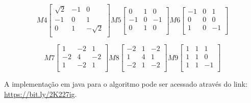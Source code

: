 \documentclass[
	12pt,				%
	oneside,			%
	a4paper,			%
	english,			%
	french,				%
	spanish,			%
	brazil,				%
	]{abntex2}
\begin{document}
\[
M4
\begin{bmatrix}
      \sqrt{2} &            -1 &  0         \\
	        -1 &             0 & 1          \\
	         0 &             1 & -\sqrt{2}  \\
\end{bmatrix} 
M5
\begin{bmatrix}
    	 	 0 &             1 &  0          \\ 
	        -1 &             0 & -1          \\ 
	         0 &             1 &  0          \\ 
\end{bmatrix}
M6
\begin{bmatrix}
  	 	 	-1 &             0 &  1          \\ 
             0 &             0 &  0          \\ 
             1 &             0 & -1          \\ 
\end{bmatrix} 
\]

\[
M7
\begin{bmatrix}
            1 &            -2 &  1           \\ 
	       -2 &             4 & -2           \\ 
	        1 &            -2 &  1           \\ 
\end{bmatrix} 
M8
\begin{bmatrix}
           -2 &             1 & -2            \\
	        1 &             4 &  1            \\
	       -2 &             1 & -2            \\
\end{bmatrix}
M9
\begin{bmatrix}
     	 	 1 &             1 &  1           \\
	         1 &             1 &  0           \\
	         1 &             1 & -1           \\
\end{bmatrix} 
\]

A implementação em java para o algoritmo pode ser acessado através do link: \url{https://bit.ly/2K227ig}.
\end{document}
